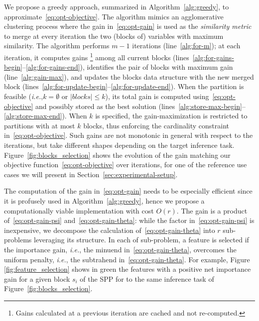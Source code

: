 \documentclass[journal]{IEEEtran}
\theoremstyle{plain} %
\newcommand{\ie}{\textit{i.e.},\xspace}
\begin{document}
We propose a greedy approach, summarized in Algorithm~\ref{alg:greedy}, to approximate~\eqref{eq:opt-objective}.
The algorithm mimics an agglomerative clustering process where the gain in~\eqref{eq:opt-gain} is used as the \textit{similarity metric} to merge at every iteration the two (blocks of) variables with maximum similarity.
The algorithm performs $m-1$ iterations (line~\ref{alg:for-m}); at each iteration, it computes gains%
\footnote{Gains calculated at a previous iteration are cached and not re-computed.}
among all current blocks (lines~\ref{alg:for-gains-begin}--\ref{alg:for-gains-end}), identifies the pair of blocks with maximum gain (line~\ref{alg:gain-max}), and updates the blocks data structure with the new merged block (lines~\ref{alg:for-update-begin}--\ref{alg:for-update-end}).
%
When the partition is feasible (\ie $k=\emptyset$ or $|\textit{blocks}|\leq k$), its total gain is computed using~\eqref{eq:opt-objective} and possibly stored as the best solution (lines~\ref{alg:store-max-begin}--\ref{alg:store-max-end}).
When $k$ is specified, the gain-maximization is restricted to partitions with at most $k$ blocks, thus enforcing the cardinality constraint in~\eqref{eq:opt-objective}.
Such gains are not monotonic in general with respect to the iterations, but take different shapes depending on the target inference task. Figure~\ref{fig:blocks_selection} shows the evolution of the gain matching our objective function~\eqref{eq:opt-objective} over iterations, for one of the reference use cases we will present in Section~\ref{sec:experimental-setup}.

The computation of the gain in~\eqref{eq:opt-gain} needs to be especially efficient since it is profusely used in Algorithm~\ref{alg:greedy}, hence we propose a computationally viable implementation with cost $O(r)$. The gain is a product of~\eqref{eq:opt-gain-psi} and~\eqref{eq:opt-gain-theta}: while the factor in~\eqref{eq:opt-gain-psi} is inexpensive, we decompose the calculation of~\eqref{eq:opt-gain-theta} into $r$ sub-problems leveraging its structure.
In each of sub-problem, a feature is selected if the importance gain, \ie the minuend in~\eqref{eq:opt-gain-theta}, overcomes the uniform penalty, \ie the subtrahend in~\eqref{eq:opt-gain-theta}.
For example, Figure \ref{fig:feature_selection} shows in green the features with a positive net importance gain for a given block $s_i$ of the SPP for to the same inference task of Figure~\ref{fig:blocks_selection}.
\end{document}
